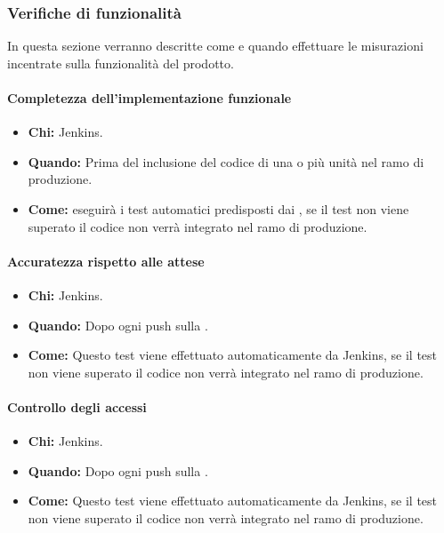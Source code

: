 \newpage
\subsubsection{Verifiche di funzionalità}
In questa sezione verranno descritte come e quando effettuare le misurazioni incentrate sulla funzionalità del prodotto.

\paragraph{Completezza dell'implementazione funzionale}
\begin{itemize}
\item \textbf{Chi:} Jenkins.
\item \textbf{Quando:} Prima del inclusione del codice di una o più unità nel ramo di produzione.
\item \textbf{Come:}  eseguirà i test automatici predisposti dai \ProgrP, se il test non viene superato il codice non verrà integrato nel ramo di produzione.
\end{itemize}

\paragraph{Accuratezza rispetto alle attese}
\begin{itemize}
\item \textbf{Chi:} Jenkins.
\item \textbf{Quando:} Dopo ogni push sulla .
\item \textbf{Come:} Questo test viene effettuato automaticamente da Jenkins, se il test non viene superato il codice non verrà integrato nel ramo di produzione.
\end{itemize}

\paragraph{Controllo degli accessi}
\begin{itemize}
\item \textbf{Chi:} Jenkins.
\item \textbf{Quando:} Dopo ogni push sulla .
\item \textbf{Come:} Questo test viene effettuato automaticamente da Jenkins, se il test non viene superato il codice non verrà integrato nel ramo di produzione.
\end{itemize}